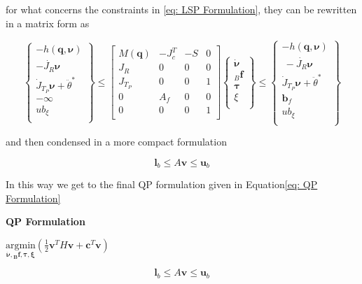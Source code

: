 for what concerns the constraints in \eqref{eq: LSP Formulation}, they can be rewritten in a matrix form as 


\begin{equation}
\begin{Bmatrix} 
-h(\mathbf{q},\bm{\nu})\\
-\dot{J_{R}}\bm{\nu} \\
\dot{J}_{T_P}\bm{\nu} + \ddot{\theta}^{*}\\
-\bm{\infty} \\
ub_{\xi} \\
\end{Bmatrix} \leq \begin{bmatrix} 
M(\mathbf{q}) & -J_c^{T} & -S & 0 \\
J_{R} & 0 & 0  & 0\\
J_{T_P} & 0 & 0  & 1\\
0 & A_{f} & 0 & 0\\
0 & 0 & 0 & 1 \\
\end{bmatrix} \begin{Bmatrix} 
\dot{\bm{\nu}} \\
{}_{B}\mathbf{f} \\
\bm{\tau}  \\
\xi \\
\end{Bmatrix} \leq \begin{Bmatrix} 
-h(\mathbf{q},\bm{\nu})\\\
-\dot{J_{R}}\bm{\nu}\\
\dot{J}_{T_P}\bm{\nu} + \ddot{\theta}^{*} \\
\mathbf{b}_{f} \\
ub_{\xi} \\
\end{Bmatrix}
\end{equation}

and then condensed in a more compact formulation

\begin{equation*}
    \mathbf{l}_b \leq A \mathbf{v} \leq \mathbf{u}_b
\end{equation*}

In this way we get to the final QP formulation given in Equation\eqref{eq: QP Formulation} 

\vspace{12pt}
\begin{center}
{\large \textbf{QP Formulation}}
\end{center}

\begin{center}
$\underset{\bm{\dot{\nu},{}_{B}\mathbf{f},\bm{\tau}}, \bm{\xi}}{\text{argmin}} (\frac{1}{2} \mathbf{v}^{T} H \mathbf{v} + \mathbf{c}^{T} \mathbf{v})$


\end{center}
\begin{equation*}
\mathbf{l}_b \leq A \mathbf{v} \leq \mathbf{u}_b
\end{equation*}